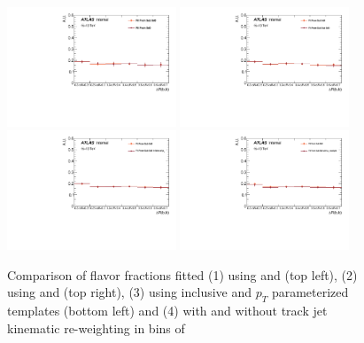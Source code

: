 \begin{figure}[htbp]
  \centering
 \includegraphics[width=0.45\textwidth]{figures/gbb/Sub_Sd0_Fits/Canv_dR_leadCrossCheck.pdf}
 \includegraphics[width=0.45\textwidth]{figures/gbb/Sub_Sd0_Fits/Canv_dR_subsubCrossCheck.pdf}\\
 \includegraphics[width=0.45\textwidth]{figures/gbb/Sub_Sd0_Fits/Canv_dR_ptbinCrossCheck.pdf}
 \includegraphics[width=0.45\textwidth]{figures/gbb/Sub_Sd0_Fits/Canv_dR_noreweightCrossCheck.pdf}\\
\caption{Comparison of flavor fractions fitted (1) using \subsdzero and \sdzero (top left), (2) using \subsdzero and \subsubsdzero (top right), (3) using inclusive and $p_T$ parameterized templates (bottom left) and (4) with and without track jet kinematic re-weighting in bins of \drbb}
  \label{fig:dR-fitfrac-crosscheck}
\end{figure}


